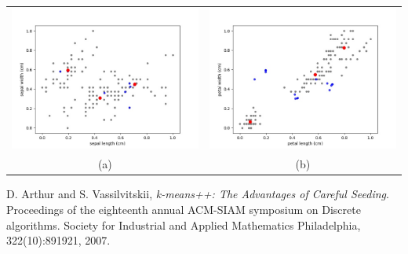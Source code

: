 \documentclass{article}
\begin{document}
\begin{center}
\begin{tabular}{c c}
\includegraphics[scale=0.3]{iris_cluster_1} &
\includegraphics[scale=0.3]{iris_cluster_2} \\
\scriptsize (a) & \scriptsize (b)
\end{tabular}
\end{center}

\medskip
 
\begin{thebibliography}{1}
D. Arthur and S. Vassilvitskii, 
\textit{k-means++: The Advantages of Careful Seeding}.
Proceedings of the eighteenth annual ACM-SIAM symposium on Discrete algorithms. Society for Industrial and Applied Mathematics Philadelphia, 322(10):891921, 2007.

\end{thebibliography}
\end{document}

